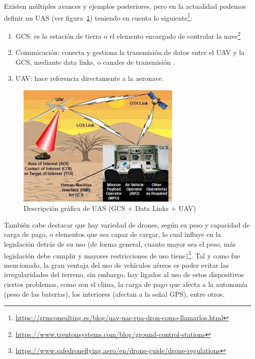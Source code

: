 Existen múltiples avances y ejemplos posteriores, pero en la actualidad podemos definir un \ac{UAS} (ver figura~\ref{fig:drone_components}) teniendo en cuenta lo siguiente\footnote[10]{\url{https://srmconsulting.es/blog/uav-uas-rpa-dron-como-llamarlos.html}}:

\begin{enumerate}
	\item \ac{GCS}: es la estación de tierra o el elemento encargado de controlar la nave\footnote[11]{\url{https://www.trentonsystems.com/blog/ground-control-stations}}
	\item Comunicación: conecta y gestiona la transmisión de datos entre el \ac{UAV} y la \ac{GCS}, mediante data links, o canales de transmisión \cite{data-link-definicion}.
    \item \ac{UAV}: hace referencia directamente a la aeronave.
\end{enumerate}

\begin{figure} [tp]
	\begin{center}
	\includegraphics[height=6cm]{imagenes/cap1/7_drone_components.jpeg}
	\end{center}
	\caption[Descripción gráfica de \ac{UAS} (GCS + Data Links + UAV)]{Descripción gráfica de \ac{UAS} (GCS + Data Links + UAV)}
	\label{fig:drone_components}
\end{figure}

También cabe destacar que hay variedad de drones, según su peso y capacidad de carga de pago, o elementos que sea capaz de cargar, lo cual influye en la legislación detrás de su uso (de forma general, cuanto mayor sea el peso, más legislación debe cumplir y mayores restricciones de uso tiene)\footnote[12]{\url{https://www.safedroneflying.aero/en/drone-guide/drone-regulations}}. Tal y como fue mencionado, la gran ventaja del uso de vehículos aéreos es poder evitar las irregularidades del terreno, sin embargo, hay ligados al uso de estos dispositivos ciertos problemas, como son el clima, la carga de pago que afecta a la autonomía (peso de las baterías), los interiores (afectan a la señal GPS), entre otros.\\

